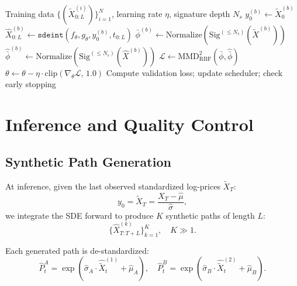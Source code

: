 \documentclass[11pt, a4paper]{article}
\newcommand{\Sig}{\mathrm{Sig}}
\newcommand{\MMD}{\mathrm{MMD}}
\begin{document}
\begin{algorithm}[H]
\caption{Training the Neural SDE with Kernel Signature MMD}
\label{alg:training}
\begin{algorithmic}[1]
\Require Training data $\{(\tilde{X}^{(i)}_{0:L})\}_{i=1}^{N}$, learning rate $\eta$, signature depth $N_s$
        \State $y_0^{(b)} \gets \tilde{X}^{(b)}_0$ 
        \State $\hat{X}^{(b)}_{0:L} \gets \texttt{sdeint}(f_\theta, g_\theta, y_0^{(b)}, t_{0:L})$ 
        \State $\bar{\phi}^{(b)} \gets \text{Normalize}\!\left(\Sig^{(\leq N_s)}(\tilde{X}^{(b)})\right)$
        \State $\hat{\bar{\phi}}^{(b)} \gets \text{Normalize}\!\left(\Sig^{(\leq N_s)}(\hat{X}^{(b)})\right)$
        \State $\mathcal{L} \gets \MMD^2_{\text{RBF}}(\bar{\phi}, \hat{\bar{\phi}})$
        \State $\theta \gets \theta - \eta \cdot \text{clip}(\nabla_\theta \mathcal{L},\, 1.0)$
    \EndFor
        \State Compute validation loss; update scheduler; check early stopping
    \EndIf
\EndFor
\end{algorithmic}
\end{algorithm}

\section{Inference and Quality Control}
\label{sec:inference}

\subsection{Synthetic Path Generation}

At inference, given the last observed standardized log-prices $\tilde{X}_{T}$:
\begin{equation}
    y_0 = \tilde{X}_T = \frac{X_T - \hat{\mu}}{\hat{\sigma}},
\end{equation}
we integrate the SDE forward to produce $K$ synthetic paths of length $L$:
\begin{equation}
    \{\hat{X}^{(k)}_{T:T+L}\}_{k=1}^{K}, \quad K \gg 1.
\end{equation}

Each generated path is de-standardized:
\begin{equation}
    \hat{P}^A_t = \exp\!\left(\hat{\sigma}_A \cdot \hat{\tilde{X}}^{(1)}_t + \hat{\mu}_A\right), \quad
    \hat{P}^B_t = \exp\!\left(\hat{\sigma}_B \cdot \hat{\tilde{X}}^{(2)}_t + \hat{\mu}_B\right).
\end{equation}
\end{document}
